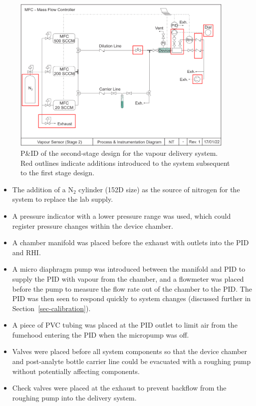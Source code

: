\documentclass[
  a4paper,
]{scrbook}
\begin{document}
\begin{figure}

{\centering \includegraphics[width=0.95\textwidth,height=\textheight]{figures/ch8/PID_V2.png}

}

\caption[P\&ID of Stage II of the vapour delivery
system.]{\label{fig-stage-2-pid}P\&ID of the second-stage design for the
vapour delivery system. Red outlines indicate additions introduced to
the system subsequent to the first stage design.}

\end{figure}

\begin{itemize}
\item
  The addition of a N\(_2\) cylinder (152D size) as the source of
  nitrogen for the system to replace the lab supply.
\item
  A pressure indicator with a lower pressure range was used, which could
  register pressure changes within the device chamber.
\item
  A chamber manifold was placed before the exhaust with outlets into the
  PID and RHI.
\item
  A micro diaphragm pump was introduced between the manifold and PID to
  supply the PID with vapour from the chamber, and a flowmeter was
  placed before the pump to measure the flow rate out of the chamber to
  the PID. The PID was then seen to respond quickly to system changes
  (discussed further in Section~\ref{sec-calibration}).
\item
  A piece of PVC tubing was placed at the PID outlet to limit air from
  the fumehood entering the PID when the micropump was off.
\item
  Valves were placed before all system components so that the device
  chamber and post-analyte bottle carrier line could be evacuated with a
  roughing pump without potentially affecting components.
\item
  Check valves were placed at the exhaust to prevent backflow from the
  roughing pump into the delivery system.
\end{itemize}
\end{document}
